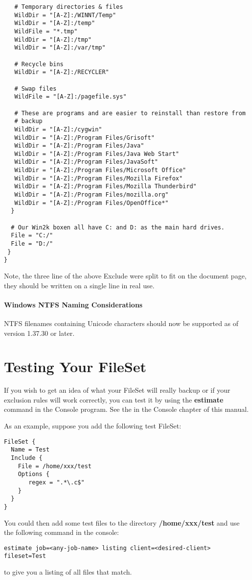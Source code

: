 \begin{verbatim}
   # Temporary directories & files
   WildDir = "[A-Z]:/WINNT/Temp"
   WildDir = "[A-Z]:/temp"
   WildFile = "*.tmp"
   WildDir = "[A-Z]:/tmp"
   WildDir = "[A-Z]:/var/tmp"

   # Recycle bins
   WildDir = "[A-Z]:/RECYCLER"

   # Swap files
   WildFile = "[A-Z]:/pagefile.sys"

   # These are programs and are easier to reinstall than restore from
   # backup
   WildDir = "[A-Z]:/cygwin"
   WildDir = "[A-Z]:/Program Files/Grisoft"
   WildDir = "[A-Z]:/Program Files/Java"
   WildDir = "[A-Z]:/Program Files/Java Web Start"
   WildDir = "[A-Z]:/Program Files/JavaSoft"
   WildDir = "[A-Z]:/Program Files/Microsoft Office"
   WildDir = "[A-Z]:/Program Files/Mozilla Firefox"
   WildDir = "[A-Z]:/Program Files/Mozilla Thunderbird"
   WildDir = "[A-Z]:/Program Files/mozilla.org"
   WildDir = "[A-Z]:/Program Files/OpenOffice*"
  }

  # Our Win2k boxen all have C: and D: as the main hard drives.
  File = "C:/"
  File = "D:/"
 }
}
\end{verbatim}
\normalsize

Note, the three line of the above Exclude were split to fit on the document
page, they should be written on a single line in real use. 

\paragraph*{Windows NTFS Naming Considerations}

NTFS filenames containing Unicode characters should now be supported
as of version 1.37.30 or later.

\section{Testing Your FileSet}

If you wish to get an idea of what your FileSet will really backup or if your
exclusion rules will work correctly, you can test it by using the {\bf
estimate} command in the Console program. See the 
 in the Console chapter of this
manual.

As an example, suppose you add the following test FileSet:

\footnotesize
\begin{verbatim}
FileSet {
  Name = Test
  Include {
    File = /home/xxx/test
    Options {
       regex = ".*\.c$"
    }
  }
}
\end{verbatim}
\normalsize

You could then add some test files to the directory {\bf /home/xxx/test}
and use the following command in the console:

\footnotesize
\begin{verbatim}
estimate job=<any-job-name> listing client=<desired-client> fileset=Test
\end{verbatim}
\normalsize

to give you a listing of all files that match.
